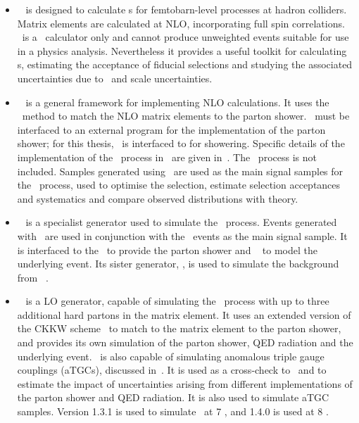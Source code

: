 \begin{itemize}
    \item \mcfm ~\cite{Campbell:2011} is designed to calculate \cx s for
    femtobarn-level processes at hadron colliders. Matrix elements are
    calculated at NLO, incorporating full spin correlations. \mcfm\ is a \cx\
    calculator only and cannot produce unweighted events suitable for use in a
    physics analysis. Nevertheless it provides a useful toolkit for calculating
    \cx s, estimating the acceptance of fiducial selections and studying the
    associated uncertainties due to \partDF\ and scale uncertainties.

    \item \powhegbox~\cite{Alioli:2010xd} is a general framework for implementing
    NLO calculations. It uses the \powheg\ method to match the NLO matrix
    elements to the parton shower. \powhegbox\ must be interfaced to an external
    program for the implementation of the parton shower; for this thesis,
    \powhegbox\ is interfaced to \pythia for showering. Specific details of the
    implementation of the \ZZ\ process in \powhegbox\ are given
    in~\cite{Melia:2011tj}. The \ggZZ\ process is not included. 
    Samples generated using \powhegbox\ are used as the main signal samples for
    the \qqZZ\ process, used to optimise the selection, estimate selection
    acceptances and systematics and compare observed distributions with theory.

    \item \ggtwoZZ~\cite{gg2ZZ} is a specialist generator used to simulate the
    \ggZZ\ process. Events generated with \ggtwoZZ\ are used in conjunction with
    the \powhegbox\ events as the main signal sample. It is interfaced to the
    \herwig\ to provide the parton shower and \jimmy~\cite{bib:jimmy} to model the underlying
    event. Its sister generator, \ggtwoWW, is used to simulate the background
    from \ggWW~\cite{Binoth:2006mf}.

    \item \sherpa~\cite{Gleisberg:2008ta} is a LO generator, capable of
    simulating the \qqZZ\ process with up to three additional hard partons in the matrix element. It
    uses an extended version of the CKKW scheme~\cite{Hoeche:2009rj} to match to the matrix element to the parton shower,
    and provides its own simulation of the parton shower, QED radiation and
    the underlying event. \sherpa\ is also capable of simulating anomalous
    triple gauge couplings (aTGCs), discussed in~\chap{TheoryZZProduction}. It is
    used as a cross-check to \powhegbox\ and to estimate the impact
    of uncertainties
    arising from different implementations of the parton shower and QED
    radiation. It is also used to simulate aTGC samples.
    Version 1.3.1 is used to simulate \qqZZllll\ at 7 \tev, and 1.4.0 is used at
    8 \tev.


\end{itemize}

